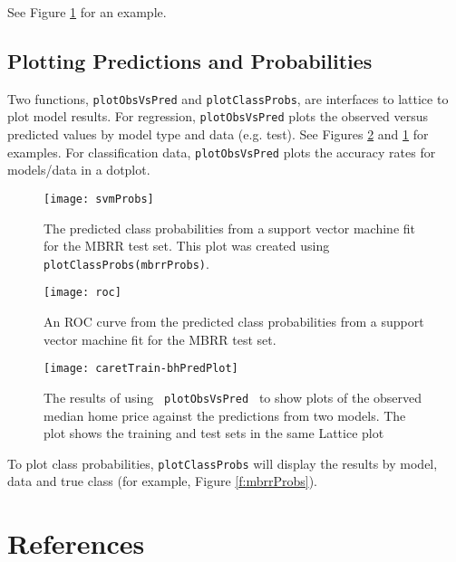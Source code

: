 \documentclass[12pt]{article}
\begin{document}
See Figure \ref{f:mbrrROC} for an example.

\subsection*{Plotting Predictions and Probabilities}

Two functions, \texttt{plotObsVsPred} and \texttt{plotClassProbs}, are interfaces to lattice to plot model results. For regression, \texttt{plotObsVsPred} plots the observed versus predicted values by model type and data (e.g. test). See Figures \ref{f:bhPredPlot} and \ref{f:mbrrROC}  for examples. For classification data, \texttt{plotObsVsPred} plots the accuracy rates for models/data in a dotplot. 



\begin{figure}[ht]
   \begin{center}      
      \texttt{[image: svmProbs]}   
      \caption{The predicted class probabilities from a support vector machine fit for the MBRR test set. This plot was created using \texttt{plotClassProbs(mbrrProbs)}.}
      \label{f:mbrrProbs}         
      \vspace*{.5 in}      
       \texttt{[image: roc]}   
      \caption{An ROC curve from the predicted class probabilities from a support vector machine fit for the MBRR test set. }
      \label{f:mbrrROC}       
   \end{center}
\end{figure}  

\begin{figure}
   \begin{center}      
\texttt{[image: caretTrain-bhPredPlot]}
      \caption{The results of using \texttt{ plotObsVsPred } to show plots of the observed median home price against the predictions from two models. The plot shows the training and test sets in the same Lattice plot}
      \label{f:bhPredPlot}         
   \end{center}
\end{figure}


To plot class probabilities, \texttt{plotClassProbs} will display the results by model, data and true class (for example, Figure \ref{f:mbrrProbs}).     

\section{References}
\end{document}
